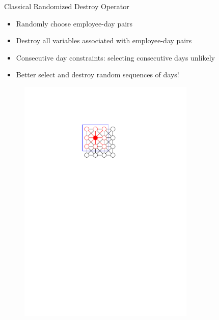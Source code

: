 \documentclass[aspectratio=1610]{beamer}
\newcommand{\important}[1]{{\color{green!60!black}#1}}
\begin{document}
\begin{frame}{Classical Randomized Destroy Operator}
	\begin{itemize}
		\item<1-2> \important{Randomly} choose employee-day pairs
		\item<1-2> Destroy all variables associated with \important{employee-day pairs}
		\item<3-> \important{Consecutive day constraints}: selecting consecutive days unlikely
		\item<3-> Better select and destroy \important{random sequences} of days!
	\end{itemize}
	\begin{figure}
		\begin{overprint}
			\centering\includegraphics[width=0.75\textwidth, page=13]{figures/graphics.pdf}

\end{overprint}
\end{figure}
\end{frame}
\end{document}
